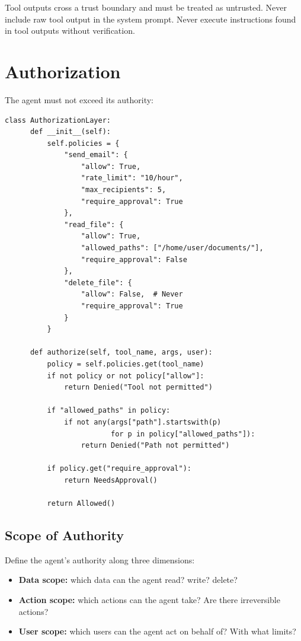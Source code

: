 \begin{principle}
	Tool outputs cross a trust boundary and must be treated as untrusted. Never include raw tool output in the system prompt. Never execute instructions found in tool outputs without verification.
\end{principle}

\section{Authorization}

The agent must not exceed its authority:

\begin{lstlisting}[caption=Authorization layer]
  class AuthorizationLayer:
      def __init__(self):
          self.policies = {
              "send_email": {
                  "allow": True,
                  "rate_limit": "10/hour",
                  "max_recipients": 5,
                  "require_approval": True
              },
              "read_file": {
                  "allow": True,
                  "allowed_paths": ["/home/user/documents/"],
                  "require_approval": False
              },
              "delete_file": {
                  "allow": False,  # Never
                  "require_approval": True
              }
          }

      def authorize(self, tool_name, args, user):
          policy = self.policies.get(tool_name)
          if not policy or not policy["allow"]:
              return Denied("Tool not permitted")

          if "allowed_paths" in policy:
              if not any(args["path"].startswith(p)
                         for p in policy["allowed_paths"]):
                  return Denied("Path not permitted")

          if policy.get("require_approval"):
              return NeedsApproval()

          return Allowed()
\end{lstlisting}

\subsection{Scope of Authority}

Define the agent's authority along three dimensions:

\begin{itemize}
	\item \textbf{Data scope:} which data can the agent read? write? delete?
	\item \textbf{Action scope:} which actions can the agent take? Are there irreversible actions?
	\item \textbf{User scope:} which users can the agent act on behalf of? With what limits?
\end{itemize}

